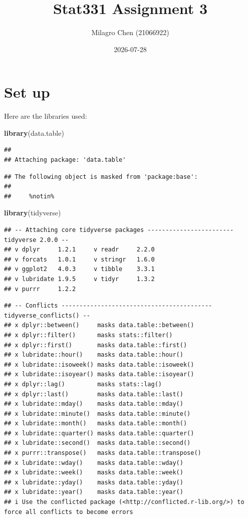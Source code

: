 \documentclass[
]{article}
\title{Stat331 Assignment 3}
\author{Milagro Chen (21066922)}
\date{2026-07-28}
\newenvironment{Shaded}{\begin{snugshade}}{\end{snugshade}}
\newcommand{\FunctionTok}[1]{\textcolor[rgb]{0.13,0.29,0.53}{\textbf{#1}}}
\newcommand{\NormalTok}[1]{#1}
\begin{document}
\maketitle

\section{Set up}\label{set-up}

Here are the libraries used:

\begin{Shaded}
\begin{Highlighting}[]
\FunctionTok{library}\NormalTok{(data.table)}
\end{Highlighting}
\end{Shaded}

\begin{verbatim}
## 
## Attaching package: 'data.table'
\end{verbatim}

\begin{verbatim}
## The following object is masked from 'package:base':
## 
##     %notin%
\end{verbatim}

\begin{Shaded}
\begin{Highlighting}[]
\FunctionTok{library}\NormalTok{(tidyverse)}
\end{Highlighting}
\end{Shaded}

\begin{verbatim}
## -- Attaching core tidyverse packages ------------------------ tidyverse 2.0.0 --
## v dplyr     1.2.1     v readr     2.2.0
## v forcats   1.0.1     v stringr   1.6.0
## v ggplot2   4.0.3     v tibble    3.3.1
## v lubridate 1.9.5     v tidyr     1.3.2
## v purrr     1.2.2
\end{verbatim}

\begin{verbatim}
## -- Conflicts ------------------------------------------ tidyverse_conflicts() --
## x dplyr::between()     masks data.table::between()
## x dplyr::filter()      masks stats::filter()
## x dplyr::first()       masks data.table::first()
## x lubridate::hour()    masks data.table::hour()
## x lubridate::isoweek() masks data.table::isoweek()
## x lubridate::isoyear() masks data.table::isoyear()
## x dplyr::lag()         masks stats::lag()
## x dplyr::last()        masks data.table::last()
## x lubridate::mday()    masks data.table::mday()
## x lubridate::minute()  masks data.table::minute()
## x lubridate::month()   masks data.table::month()
## x lubridate::quarter() masks data.table::quarter()
## x lubridate::second()  masks data.table::second()
## x purrr::transpose()   masks data.table::transpose()
## x lubridate::wday()    masks data.table::wday()
## x lubridate::week()    masks data.table::week()
## x lubridate::yday()    masks data.table::yday()
## x lubridate::year()    masks data.table::year()
## i Use the conflicted package (<http://conflicted.r-lib.org/>) to force all conflicts to become errors
\end{verbatim}
\end{document}
